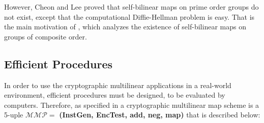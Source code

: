 However, Cheon and Lee \cite{ChL09} proved that self-bilinear maps on prime order groups do not exist, except that the computational Diffie-Hellman problem is easy. That is the main motivation of \cite{BCM16}, which analyzes the existence of self-bilinear maps on groups of composite order.

\subsection{Efficient Procedures}

In order to use the cryptographic multilinear applications in a real-world environment, efficient procedures must be designed, to be evaluated by computers. Therefore, as specified in \cite{GGH13}
a cryptographic multilinear map scheme is a 5-uple $\mathcal{MMP} = $ \textbf{(InstGen, EncTest, add, neg, map)} that is described below:
